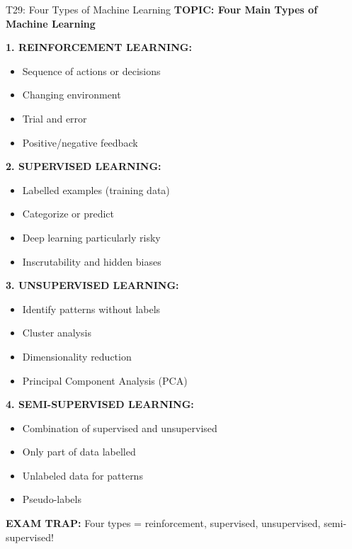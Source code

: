 \documentclass[8pt]{beamer}
\begin{document}
	\begin{frame}{T29: Four Types of Machine Learning}
		\fontsize{6.5}{7.5}\selectfont
		\textbf{TOPIC: Four Main Types of Machine Learning}
		
		\vspace{0.1cm}
		\textbf{1. REINFORCEMENT LEARNING:}
		\begin{itemize}
			\item Sequence of actions or decisions
			\item Changing environment
			\item Trial and error
			\item Positive/negative feedback
		\end{itemize}
		
		\vspace{0.1cm}
		\textbf{2. SUPERVISED LEARNING:}
		\begin{itemize}
			\item Labelled examples (training data)
			\item Categorize or predict
			\item Deep learning particularly risky
			\item Inscrutability and hidden biases
		\end{itemize}
		
		\vspace{0.1cm}
		\textbf{3. UNSUPERVISED LEARNING:}
		\begin{itemize}
			\item Identify patterns without labels
			\item Cluster analysis
			\item Dimensionality reduction
			\item Principal Component Analysis (PCA)
		\end{itemize}
		
		\vspace{0.1cm}
		\textbf{4. SEMI-SUPERVISED LEARNING:}
		\begin{itemize}
			\item Combination of supervised and unsupervised
			\item Only part of data labelled
			\item Unlabeled data for patterns
			\item Pseudo-labels
		\end{itemize}
		
		\textcolor{myred}{\textbf{EXAM TRAP:}} Four types = \textcolor{myblue}{reinforcement, supervised, unsupervised, semi-supervised}!
	\end{frame}
	
\end{document}
